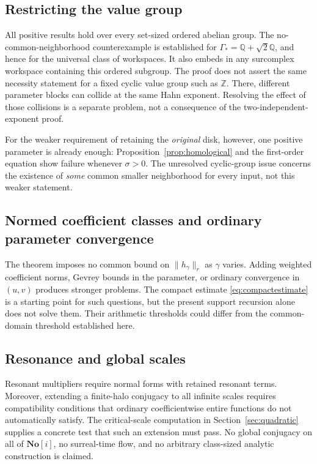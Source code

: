 \documentclass[11pt,a4paper]{article}
\numberwithin{equation}{section}
\theoremstyle{definition}
\theoremstyle{remark}
\newcommand{\Q}{\mathbb Q}
\newcommand{\Z}{\mathbb Z}
\newcommand{\No}{\mathbf{No}}
\newcommand{\norm}[1]{\lVert #1\rVert}
\newcommand{\Gstar}{\Gamma_*}
\begin{document}
\subsection{Restricting the value group}

All positive results hold over every set-sized ordered abelian group.
The no-common-neighborhood counterexample is established for
$\Gstar=\Q+\sqrt2\Q$, and hence for the universal class of workspaces.
It also embeds in any surcomplex workspace containing this ordered subgroup.
The proof does not assert the same necessity statement for a fixed cyclic
value group such as $\Z$. There, different parameter blocks can collide
at the same Hahn exponent. Resolving the effect of those collisions is a
separate problem, not a consequence of the two-independent-exponent proof.

For the weaker requirement of retaining the \emph{original} disk, however,
one positive parameter is already enough: Proposition~\ref{prop:homological}
and the first-order equation show failure whenever $\sigma>0$.
The unresolved cyclic-group issue concerns the existence of \emph{some}
common smaller neighborhood for every input, not this weaker statement.

\subsection{Normed coefficient classes and ordinary parameter convergence}

The theorem imposes no common bound on $\norm{h_\gamma}_r$ as $\gamma$
varies. Adding weighted coefficient norms, Gevrey bounds in the parameter,
or ordinary convergence in $(u,v)$ produces stronger problems.
The compact estimate \eqref{eq:compactestimate} is a starting point for
such questions, but the present support recursion alone does not solve
them. Their arithmetic thresholds could differ from the common-domain
threshold established here.

\subsection{Resonance and global scales}

Resonant multipliers require normal forms with retained resonant terms.
Moreover, extending a finite-halo conjugacy to all infinite scales requires
compatibility conditions that ordinary coefficientwise entire functions do
not automatically satisfy. The critical-scale computation in
Section~\ref{sec:quadratic} supplies a concrete test that such an extension
must pass. No global conjugacy on all of $\No[i]$, no surreal-time flow,
and no arbitrary class-sized analytic construction is claimed.
\end{document}
